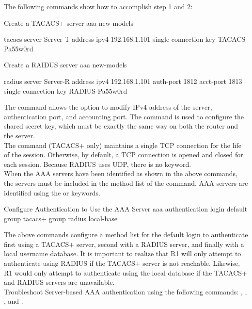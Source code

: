 The following commands show how to accomplish step 1 and 2:

\begin{sexylisting}{Create a TACACS+ server}
aaa new-models

tacacs server Server-T
  address ipv4 192.168.1.101
  single-connection
  key TACACS-Pa55w0rd
\end{sexylisting}

\begin{sexylisting}{Create a RAIDUS server}
aaa new-models
 
radius server Server-R
  address ipv4 192.168.1.101 auth-port 1812 acct-port 1813
  single-connection
  key RADIUS-Pa55w0rd
\end{sexylisting}

The  command allows the option to modify IPv4 address of the server, authentication port, and accounting port. The  command is used to configure the shared secret key, which must be exactly the same way on both the router and the server.\\

The  command (TACACS+ only) maintains a single TCP connection for the life of the session. Otherwise, by default, a TCP connection is opened and closed for each session. Because RADIUS uses UDP, there is no  keyword.\\

When the AAA servers have been identified as shown in the above commands, the servers must be included in the method list of the  command. AAA servers are identified using the  or  keywords. 

\begin{sexylisting}{Configure Authentication to Use the AAA Server}
aaa authentication login default group tacacs+ group radius local-base
\end{sexylisting}

The above commands configure a method list for the default login to authenticate first using a TACACS+ server, second with a RADIUS server, and finally with a local username database. It is important to realize that R1 will only attempt to authenticate using RADIUS if the TACACS+ server is not reachable. Likewise, R1 would only attempt to authenticate using the local database if the TACACS+ and RADIUS servers are unavailable.\\

Troubleshoot Server-based AAA authentication using the following commands: , , , and .


